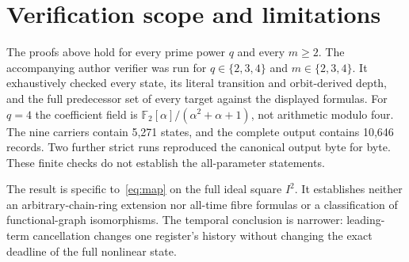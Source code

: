 \section{Verification scope and limitations}
\label{sec:scope}

The proofs above hold for every prime power $q$ and every $m\geq2$.
The accompanying author verifier was run for
$q\in\{2,3,4\}$ and $m\in\{2,3,4\}$. It exhaustively checked every
state, its literal transition and orbit-derived depth, and the full
predecessor set of every target against the displayed formulas.
For $q=4$ the coefficient field is
$\mathbb F_2[\alpha]/(\alpha^2+\alpha+1)$, not arithmetic modulo four.
The nine carriers contain 5,271 states, and the complete output contains
10,646 records. Two further strict runs reproduced the canonical output
byte for byte. These finite checks do not establish the all-parameter
statements.

The result is specific to~\eqref{eq:map} on the full ideal square $I^2$.
It establishes neither an arbitrary-chain-ring extension nor all-time fibre
formulas or a classification of functional-graph isomorphisms. The temporal
conclusion is narrower: leading-term cancellation changes one register's
history without changing the exact deadline of the full nonlinear state.
